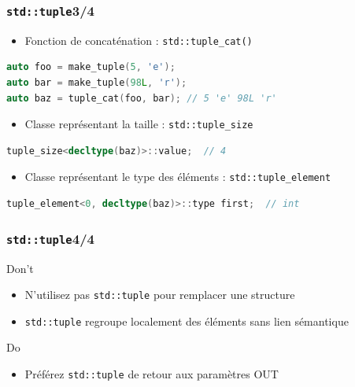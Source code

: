 \documentclass[C++.tex]{subfiles}
\begin{document}
\begin{frame}[fragile]
	\frametitle{\lstinline|std::tuple|\titlehfill{}3/4}
	\begin{itemize}
		\item Fonction de concaténation : \lstinline|std::tuple_cat()|
	\end{itemize}

	\begin{lstlisting}[language=C++]
auto foo = make_tuple(5, 'e');
auto bar = make_tuple(98L, 'r');
auto baz = tuple_cat(foo, bar); // 5 'e' 98L 'r'\end{lstlisting}

	\begin{itemize}
		\item Classe représentant la taille : \lstinline|std::tuple_size|
	\end{itemize}

	\begin{lstlisting}[language=C++]
tuple_size<decltype(baz)>::value;  // 4\end{lstlisting}

	\begin{itemize}
		\item Classe représentant le type des éléments : \lstinline|std::tuple_element|
	\end{itemize}

	\begin{lstlisting}[language=C++]
tuple_element<0, decltype(baz)>::type first;  // int\end{lstlisting}
\end{frame}

\begin{frame}[fragile]
	\frametitle{\lstinline|std::tuple|\titlehfill{}4/4}
	\begin{alertblock}{Don't}
		\begin{itemize}
			\item N'utilisez pas \lstinline|std::tuple| pour remplacer une structure
			\item \lstinline|std::tuple| regroupe localement des éléments sans lien sémantique
		\end{itemize}
	\end{alertblock}

	\begin{exampleblock}{Do}
		\begin{itemize}
			\item Préférez \lstinline|std::tuple| de retour aux paramètres OUT
		\end{itemize}
	\end{exampleblock}
\end{frame}
\end{document}
